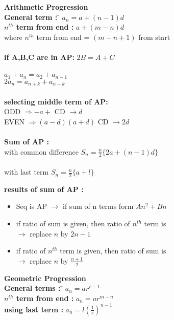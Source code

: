 \documentclass[11pt,a4paper,landscape]{article}
\begin{document}
\begin{multicols}{3}


\begin{tabbing}
{\bfseries {\Large Arithmetic Progression}}\\
{\bfseries General term :} \hspace{10mm} \= $a_n = a+(n-1)d$ \\
{\bfseries $n^{th}$ term from  end  :} \> $a+(m-n)d$ \\
where $n^{th}$ term from  end = $(m-n+1)$ from start\\ \\

{\bfseries if A,B,C are in AP:}
$2B=A+C$\\ \\
$a_1 + a_n = a_2 + a_{n-1}$\\
$2a_n = a_{n+k} + a_{n-k}$\\  \\

{\bfseries selecting middle term of AP:} \\
ODD $\Rightarrow - a +$  \> CD $\rightarrow d$\\
EVEN $\Rightarrow (a-d)(a+d)$  \> CD $\rightarrow 2d$\\ \\

{\bfseries Sum of AP :} \\
with common difference \> $\displaystyle S_n = \frac{n}{2}\{2a+(n-1)d\}$\\ \\ 
with last term \> $\displaystyle S_n = \frac{n}{2}\{a+l\}$
\end{tabbing}

{\bfseries \noindent results of sum of AP :} 
\begin{itemize}
  	\item Seq is AP $\rightarrow$ if sum of n terms form $An^{2}+Bn$
	\item if ratio of sum is given, then ratio of $n^{th}$ term is \\ $\rightarrow$ replace $n$ by $2n-1$
	\item if ratio of $n^{th}$ term is given, then ratio of sum is \\ $\rightarrow$ replace $n$ by $\displaystyle \frac{n+1}{2}$
\\
\end{itemize}

\begin{tabbing}
{\bfseries {\Large Geometric Progression}}\\
{\bfseries General terms  :} \hspace{10mm} \= $a_n = ar^{r-1}$ \\
{\bfseries $n^{th}$ term from  end  :} \> $a_n = ar^{m-n}$ \\
{\bfseries using last term  :} \> $\displaystyle a_n= l \left({\frac{1}{r}} \right)^{n-1}$\\
\end{tabbing}


\end{multicols}
\end{document}
